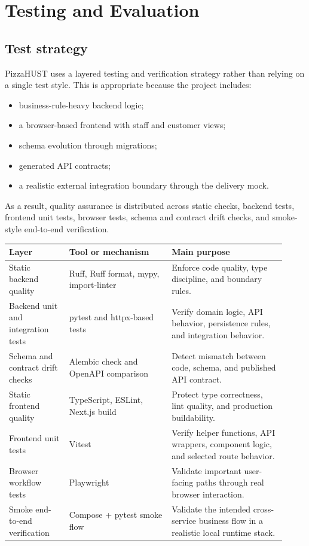 \section{Testing and Evaluation}

\subsection{Test strategy}

PizzaHUST uses a layered testing and verification strategy rather than relying on a single test style. This is appropriate because the project includes:

\begin{itemize}
    \item business-rule-heavy backend logic;
    \item a browser-based frontend with staff and customer views;
    \item schema evolution through migrations;
    \item generated API contracts;
    \item a realistic external integration boundary through the delivery mock.
\end{itemize}

As a result, quality assurance is distributed across static checks, backend tests, frontend unit tests, browser tests, schema and contract drift checks, and smoke-style end-to-end verification.

\begingroup
\small
\setlength{\LTpre}{0.4em}
\setlength{\LTpost}{0.8em}
\label{tab:test-artifacts}
\begin{tabular}{L{0.20\linewidth} L{0.34\linewidth} L{0.38\linewidth}}
\toprule
\textbf{Layer} & \textbf{Tool or mechanism} & \textbf{Main purpose} \\
\midrule
Static backend quality & Ruff, Ruff format, mypy, import-linter & Enforce code quality, type discipline, and boundary rules. \\
Backend unit and integration tests & pytest and httpx-based tests & Verify domain logic, API behavior, persistence rules, and integration behavior. \\
Schema and contract drift checks & Alembic check and OpenAPI comparison & Detect mismatch between code, schema, and published API contract. \\
Static frontend quality & TypeScript, ESLint, Next.js build & Protect type correctness, lint quality, and production buildability. \\
Frontend unit tests & Vitest & Verify helper functions, API wrappers, component logic, and selected route behavior. \\
Browser workflow tests & Playwright & Validate important user-facing paths through real browser interaction. \\
Smoke end-to-end verification & Compose + pytest smoke flow & Validate the intended cross-service business flow in a realistic local runtime stack. \\
\bottomrule
\end{tabular}
\endgroup

